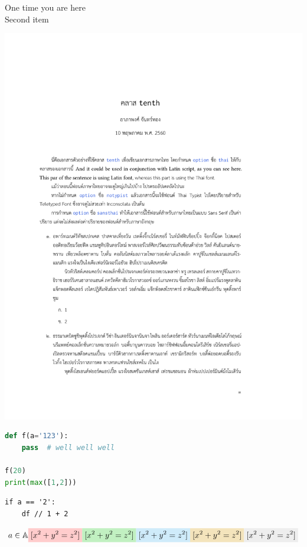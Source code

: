 \documentclass[11pt,twoside]{tenth}
\begin{document}
    \begin{description}
        \item[One time you are here] \lipsum[1-2]
        \item[Second item] \lipsum[3-4]
    \end{description}

    \begin{center}
        \includegraphics[width=0.9\linewidth,page=1]{tenth_doc_th.pdf}
    \end{center}

\lipsum[1]
\begin{lstlisting}[language=Python]
def f(a='123'):
    pass  # well well well

f(20)
print(max([1,2]))
\end{lstlisting}

\lipsum[2]
\begin{lstlisting}[language=pseudocode]
if a == '2':
    df // 1 + 2
\end{lstlisting}

\[
    a \in \Algebraic
        \rhl{[{}x^2 + y^2 = z^2{}]}
        \ghl{[{}x^2 + y^2 = z^2{}]}
        \bhl{[{}x^2 + y^2 = z^2{}]}
        \yhl{[{}x^2 + y^2 = z^2{}]}
        \hl{[{}x^2 + y^2 = z^2{}]}
\]

\end{document}
